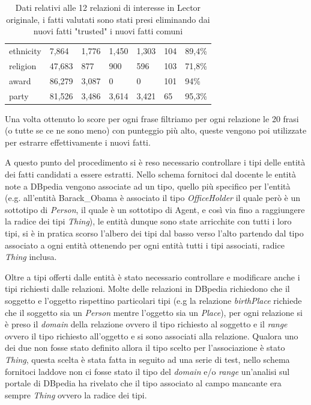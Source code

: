 \documentclass[10pt,a4paper,twocolumn]{article}
\begin{document}
\begin{table}[t]
\begin{minipage}{\textwidth}
\begin{tabular}{lllllll}
	ethnicity            & 7,864                & 1,776                    & 1,450                      & 1,303        & 104        & 89,4\%     \\
	religion             & 47,683               & 877                      & 900                        & 596          & 103        & 71,8\%     \\
	award                & 86,279               & 3,087                    & 0                          & 0            & 101        & 94\%       \\
	party                & 81,526               & 3,486                    & 3,614                      & 3,421        & 65         & 95,3\%    
	\end{tabular}
\end{minipage}
	\caption{Dati relativi alle 12 relazioni di interesse in Lector originale, i fatti valutati sono stati presi eliminando dai nuovi fatti "trusted" i nuovi fatti comuni}
	\label{my-label}
\end{table}

Una volta ottenuto lo score per ogni frase filtriamo per ogni relazione le 20 frasi (o tutte se ce ne sono meno) con punteggio più alto, queste vengono poi utilizzate per estrarre effettivamente i nuovi fatti. 

A questo punto del procedimento si è reso necessario controllare i tipi delle entità dei fatti candidati a essere estratti. Nello schema fornitoci dal docente le entità note a DBpedia vengono associate ad un tipo, quello più specifico per l'entità (e.g. all'entità Barack\_Obama è associato il tipo \textit{OfficeHolder} il quale però è un sottotipo di \textit{Person}, il quale è un sottotipo di Agent, e così via fino a raggiungere la radice dei tipi \textit{Thing}), le entità dunque sono state arricchite con tutti i loro tipi, si è in pratica scorso l'albero dei tipi dal basso verso l'alto partendo dal tipo associato a ogni entità ottenendo per ogni entità tutti i tipi associati, radice \textit{Thing} inclusa.

Oltre a tipi offerti dalle entità è stato necessario controllare e modificare anche i tipi richiesti dalle relazioni. Molte delle relazioni in DBpedia richiedono che il soggetto e l'oggetto rispettino particolari tipi (e.g la relazione \textit{birthPlace} richiede che il soggetto sia un \textit{Person} mentre l'oggetto sia un \textit{Place}), per ogni relazione si è preso il \textit{domain} della relazione ovvero il tipo richiesto al soggetto e il \textit{range} ovvero il tipo richiesto all'oggetto e si sono associati alla relazione. Qualora uno dei due non fosse stato definito allora il tipo scelto per l'associazione è stato \textit{Thing}, questa scelta è stata fatta in seguito ad una serie di test, nello schema fornitoci laddove non ci fosse stato il tipo del \textit{domain} e/o \textit{range} un'analisi sul portale di DBpedia ha rivelato che il tipo associato al campo mancante era sempre \textit{Thing} ovvero la radice dei tipi.
\end{document}
